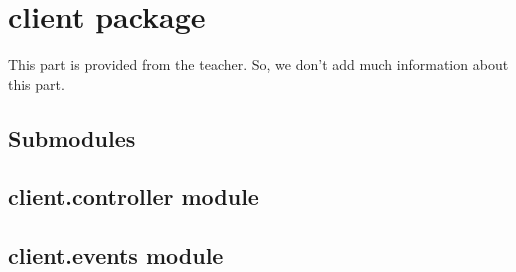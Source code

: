 \documentclass[letterpaper,10pt,english]{sphinxmanual}
\begin{document}
\sphinxstepscope


\chapter{client package}
\label{\detokenize{client:client-package}}\label{\detokenize{client::doc}}
\sphinxAtStartPar
This part is provided from the teacher. So, we don’t add much information about this part.


\section{Submodules}
\label{\detokenize{client:submodules}}

\section{client.controller module}
\label{\detokenize{client:client-controller-module}}

\section{client.events module}
\label{\detokenize{client:module-client.events}}\label{\detokenize{client:client-events-module}}
\end{document}
